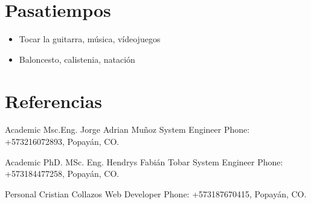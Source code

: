 \documentclass[american]{cv-class}
\begin{document}
\newpage
\section{Pasatiempos}
    \begin{itemize}
        \item
        {Tocar la guitarra, música, vídeojuegos}
        \item
        {Baloncesto, calistenia, natación}
        \\
    \end{itemize}



    	
    	

\section{Referencias}
\begin{entrylist}
	
	\entry
	{Academic}
	{Msc.Eng. Jorge Adrian Muñoz}
	{System Engineer} 
	{Phone: +573216072893, Popayán, CO.}

	\entry
	{Academic}
	{PhD. MSc. Eng. Hendrys Fabián Tobar}
	{System Engineer} 
	{Phone: +573184477258, Popayán, CO.}
	
	\entry
    {Personal}
	{Cristian Collazos}
	{Web Developer} 
	{Phone: +573187670415, Popayán, CO.}


\end{entrylist}
\end{document}
